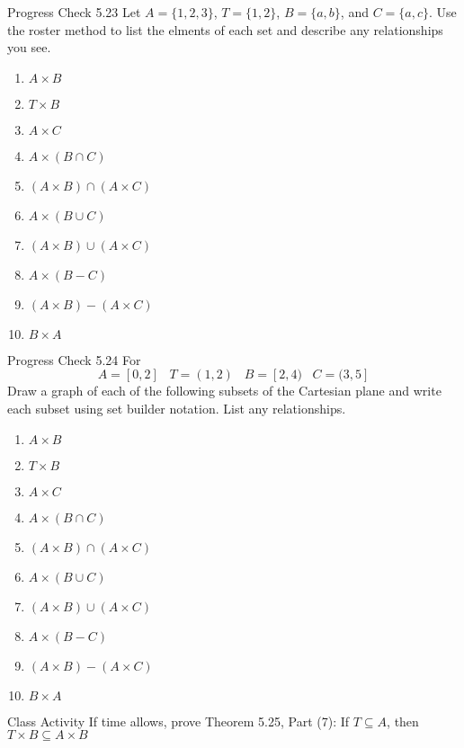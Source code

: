 \documentclass{beamer}
\begin{document}
\begin{frame}{Progress Check 5.23}
    Let $A = \{1,2,3\}$, $T = \{1,2\}$, $B = \{a,b\}$, and $C = \{a,c\}$. Use the roster method to list the elments of each set and describe any relationships you see.
    \begin{multicols}{2}
    \begin{enumerate}
        \item $A \times B$
        \item $T \times B$
        \item $A \times C$
        \item $A \times (B \cap C)$
        \item $(A \times B) \cap (A \times C)$
        \item $A \times (B \cup C)$
        \item $(A \times B) \cup (A \times C)$
        \item $A \times (B - C)$
        \item $(A \times B) - (A \times C)$
        \item $B \times A$
    \end{enumerate}
    \end{multicols}
\end{frame}

\begin{frame}{Progress Check 5.24}
    For
    \[
    A = [0,2] \;\;\; T = (1,2) \;\;\; B = [2,4) \;\;\; C = (3,5]
    \]
    Draw a graph of each of the following subsets of the Cartesian plane and
write each subset using set builder notation.  List any relationships.
\begin{multicols}{2}
    \begin{enumerate}
        \item $A \times B$
        \item $T \times B$
        \item $A \times C$
        \item $A \times (B \cap C)$
        \item $(A \times B) \cap (A \times C)$
        \item $A \times (B \cup C)$
        \item $(A \times B) \cup (A \times C)$
        \item $A \times (B - C)$
        \item $(A \times B) - (A \times C)$
        \item $B \times A$
    \end{enumerate}
    \end{multicols}
\end{frame}

\begin{frame}[t]{Class Activity}
    If time allows, prove Theorem 5.25, Part (7): If $T \subseteq A$, then $T \times B \subseteq A \times B$
\end{frame}
\end{document}

